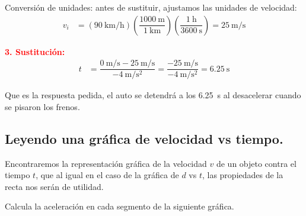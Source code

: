 \documentclass[14pt]{extarticle}
\newcommand{\textocolor}[2]{\textbf{\textcolor{#1}{#2}}}
\begin{document}
\vspace{0.3cm}
Conversión de unidades: antes de sustituir, ajustamos las unidades de velocidad:
\begin{align*}
v_{i} &= \left( \SI[per-mode=fraction]{90}{\kilo\meter\per\hour} \right)  \left( \dfrac{\SI{1000}{\meter}}{\SI{1}{\kilo\meter}} \right)  \left( \dfrac{\SI{1}{\hour}}{\SI{3600}{\second}} \right) =  \SI[per-mode=fraction]{25}{\meter\per\second}
\end{align*}

\textocolor{red}{3. Sustitución:}
\begin{align*}
t &=  \dfrac{ \SI{0}{\meter\per\second} - \SI{25}{\meter\per\second}}{- \SI{4}{\meter\per\square\second}} = \dfrac{- \SI{25}{\meter\per\second}}{- \SI{4}{\meter\per\square\second}} = \SI{6.25}{\second}
\end{align*}

Que es la respuesta pedida, el auto se detendrá a los \SI{6.25}{\second} al desacelerar cuando se pisaron los frenos.

\subsection{Leyendo una gráfica de velocidad vs tiempo.}

Encontraremos la representación gráfica de la velocidad $v$ de un objeto contra el tiempo $t$, que al igual en el caso de la gráfica de $d$ vs $t$, las propiedades de la recta nos serán de utilidad.

Calcula la aceleración en cada segmento de la siguiente gráfica.
\begin{figure}[H]
    \centering
\end{figure}
\end{document}

